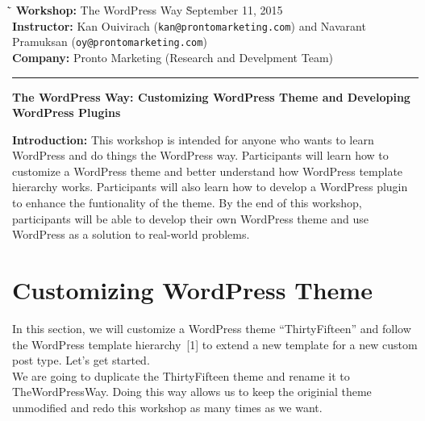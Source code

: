 \documentclass{article}
\begin{document}
\begin{tabbing}
    \`\=\kill
    \textbf{Workshop:} The WordPress Way
    \` September 11, 2015 \\
    \textbf{Instructor:} Kan Ouivirach ({\tt \small kan@prontomarketing.com})
        and Navarant Pramuksan ({\tt \small oy@prontomarketing.com}) \\
    \textbf{Company:} Pronto Marketing (Research and Develpment Team)
\end{tabbing}

\hrule

\vspace{.25in}

\begin{center}
    \textbf{\Large The WordPress Way: Customizing WordPress Theme and
        Developing WordPress Plugins}
\end{center}

\vspace{.15in}

\noindent \textbf{Introduction:} This workshop is intended for anyone who wants
to learn WordPress and do things the WordPress way. Participants will learn how
to customize a WordPress theme and better understand how WordPress template
hierarchy works. Participants will also learn how to develop a WordPress plugin
to enhance the funtionality of the theme. By the end of this workshop,
participants will be able to develop their own WordPress theme and use
WordPress as a solution to real-world problems.

\section*{Customizing WordPress Theme}

\noindent In this section, we will customize a WordPress theme
``ThirtyFifteen'' and follow the WordPress template hierarchy~[1] to extend a
new template for a new custom post type. Let's get started. \\

\noindent We are going to duplicate the ThirtyFifteen theme and rename it to
TheWordPressWay. Doing this way allows us to keep the originial theme
unmodified and redo this workshop as many times as we want.
\end{document}
